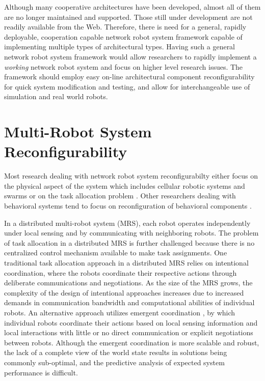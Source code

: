     Although many cooperative architectures have been developed, almost all 
      of them are no longer maintained and supported.
    Those still under development are not readily available from the Web.
    Therefore, there is need for a general, rapidly deployable, cooperation
      capable network robot system framework capable of implementing multiple 
      types of architectural types.
    Having such a general network robot system framework would allow researchers 
      to rapidly implement a \textit{working} network robot system and focus on 
      higher level research issues.
    The framework should employ easy on-line architectural component 
      reconfigurability for quick system modification and testing,
      and allow for interchangeable use of simulation and real world
      robots.

  \section{Multi-Robot System Reconfigurability}

    Most research dealing with network robot system reconfigurabilty either
      focus on the physical aspect of the system which includes cellular 
      robotic systems and swarms \cite{Beni2005,Beni1989} or on the task
      allocation problem \cite{Lerman2006,Gerkey2004}.
    Other researchers dealing with behavioral systems tend to focus on
      reconfiguration of behavioral components \cite{Cragg2006}.

    In a distributed multi-robot system (MRS), each robot operates independently 
      under local sensing and by communicating with neighboring robots. 
    The problem of task allocation in a distributed MRS is further challenged 
      because there is no centralized control mechanism available to make task 
      assignments. 
    One traditional task allocation approach \cite{Parker1998} in a distributed 
      MRS relies on intentional coordination, where the robots coordinate their 
      respective actions through deliberate communications and negotiations. 
    As the size of the MRS grows, the complexity of the design of intentional 
      approaches increases due to increased demands in communication bandwidth 
      and computational abilities of individual robots. 
    An alternative approach utilizes emergent coordination 
      \cite{Salemi2001,Bojinov2000,Rus1999},
      by which individual robots coordinate their actions based on local sensing 
      information and local interactions with little or no direct communication 
      or explicit negotiations between robots. 
    Although the emergent coordination is more scalable and robust, the lack of 
      a complete view of the world state results in solutions being commonly 
      sub-optimal, and the predictive analysis of expected system performance is 
      difficult.

